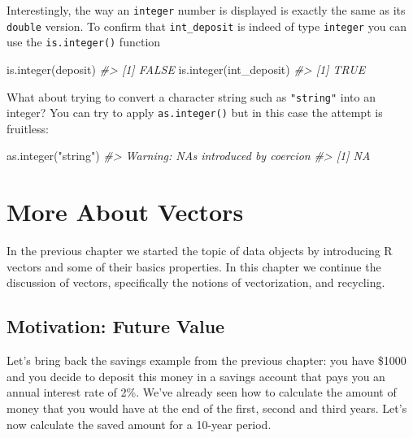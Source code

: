 \documentclass[
]{book}
\newenvironment{Shaded}{\begin{snugshade}}{\end{snugshade}}
\newcommand{\CommentTok}[1]{\textcolor[rgb]{0.56,0.35,0.01}{\textit{#1}}}
\newcommand{\FunctionTok}[1]{\textcolor[rgb]{0.00,0.00,0.00}{#1}}
\newcommand{\NormalTok}[1]{#1}
\newcommand{\StringTok}[1]{\textcolor[rgb]{0.31,0.60,0.02}{#1}}
\begin{document}
Interestingly, the way an \texttt{integer} number is displayed is exactly the same
as its \texttt{double} version. To confirm that \texttt{int\_deposit} is indeed of type
\texttt{integer} you can use the \texttt{is.integer()} function

\begin{Shaded}
\begin{Highlighting}[]
\FunctionTok{is.integer}\NormalTok{(deposit)}
\CommentTok{\#\textgreater{} [1] FALSE}
\FunctionTok{is.integer}\NormalTok{(int\_deposit)}
\CommentTok{\#\textgreater{} [1] TRUE}
\end{Highlighting}
\end{Shaded}

What about trying to convert a character string such as \texttt{"string"} into an
integer? You can try to apply \texttt{as.integer()} but in this case the attempt is
fruitless:

\begin{Shaded}
\begin{Highlighting}[]
\FunctionTok{as.integer}\NormalTok{(}\StringTok{"string"}\NormalTok{)}
\CommentTok{\#\textgreater{} Warning: NAs introduced by coercion}
\CommentTok{\#\textgreater{} [1] NA}
\end{Highlighting}
\end{Shaded}

\hypertarget{more-about-vectors}{%
\chapter{More About Vectors}\label{more-about-vectors}}

In the previous chapter we started the topic of data objects by introducing
R vectors and some of their basics properties. In this chapter we continue the
discussion of vectors, specifically the notions of vectorization, and
recycling.

\hypertarget{motivation-future-value}{%
\section{Motivation: Future Value}\label{motivation-future-value}}

Let's bring back the savings example from the previous chapter: you have \$1000
and you decide to deposit this money in a savings account that pays you an
annual interest rate of 2\%. We've already seen how to calculate the amount of
money that you would have at the end of the first, second and third years. Let's
now calculate the saved amount for a 10-year period.
\end{document}
